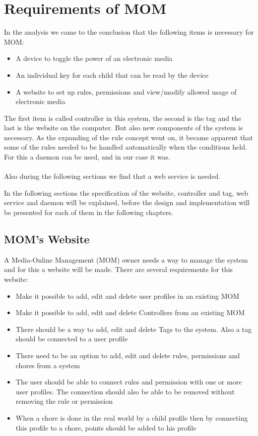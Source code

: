 \chapter{Requirements of MOM}
\label{chap:RequirMOM}

In the analysis we came to the conclusion that the following items is necessary for MOM: 
\begin{itemize}
	\item A device to toggle the power of an electronic media
	\item An individual key for each child that can be read by the device
	\item A website to set up rules, permissions and view/modify allowed usage of electronic media
\end{itemize} 


The first item is called controller in this system, the second is the tag and the last is the website on the computer. But also new components of the system is necessary. 
As the expanding of the rule concept went on, it became apparent that some of the rules needed to be handled automatically when the conditions held. For this a daemon can be used, and in our case it was.\\
\\
Also during the following sections we find that a web service is needed. 

In the following sections the specification of the website, controller and tag, web service and daemon will be explained, before the design and implementation will be presented for each of them in the following chapters.  

\section{MOM's Website}
\label{section:momswebsite}
A Media-Online Management (MOM) owner needs a way to manage the system and for this a website will be made. There are several requirements for this website:

\begin{itemize}
	\item Make it possible to add, edit and delete user profiles in an existing MOM 
	\item Make it possible to add, edit and delete Controllers from an existing MOM
	\item There should be a way to add, edit and delete Tags to the system. Also a tag should be connected to a user profile
	\item There need to be an option to add, edit and delete rules, permissions and chores from a system
	\item The user should be able to connect rules and permission with one or more user profiles. The connection should also be able to be removed without removing the rule or permission
	\item When a chore is done in the real world by a child profile then by connecting this profile to a chore, points should be added to his profile
\end{itemize}

